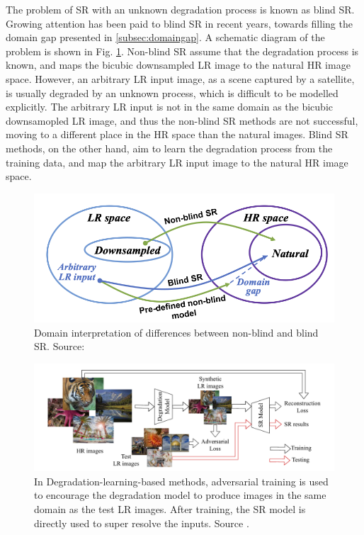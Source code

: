         The problem of SR with an unknown degradation process is known as blind SR. 
        Growing attention has been paid to blind SR in recent years, towards filling the domain gap presented in \ref{subsec:domaingap}.
        A schematic diagram of the problem is shown in Fig. \ref{fig:2-DomainGap}. 
        Non-blind SR assume that the degradation process is known, and maps the bicubic downsampled LR image to the natural HR image space.
        However, an arbitrary LR input image, as a scene captured by a satellite, is usually degraded by an unknown process, which is difficult to be modelled explicitly.
        The arbitrary LR input is not in the same domain as the bicubic downsamopled LR image, and thus the non-blind SR methods are not successful, moving to a different place in the HR space than the natural images.
        Blind SR methods, on the other hand, aim to learn the degradation process from the training data, and map the arbitrary LR input image to the natural HR image space.

        \begin{figure}[H]
            \centering
            \includegraphics[scale=0.45]{Includes/2-DomainGap.png}
            \caption{Domain interpretation of differences between non-blind and blind SR. Source: \cite{liu2021blind}}
            \label{fig:2-DomainGap}
        \end{figure}


        \begin{figure}[H]
            \centering
            \includegraphics[scale=0.65]{Includes/3-GAN-degradation-model.png}
            \caption{In Degradation-learning-based methods, 
                     adversarial training is used to encourage the degradation model to produce images in the same domain as the test LR images.
                     After training, the SR model is directly used to super resolve the inputs.
                     Source \cite{luo2022learning}.}
            \label{fig:3-GAN-degradation-model}
        \end{figure}

        

\clearpage